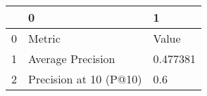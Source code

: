 \begin{tabular}{lll}
\toprule
{} &                       0 &         1 \\
\midrule
0 &                  Metric &     Value \\
1 &       Average Precision &  0.477381 \\
2 &  Precision at 10 (P@10) &       0.6 \\
\bottomrule
\end{tabular}
